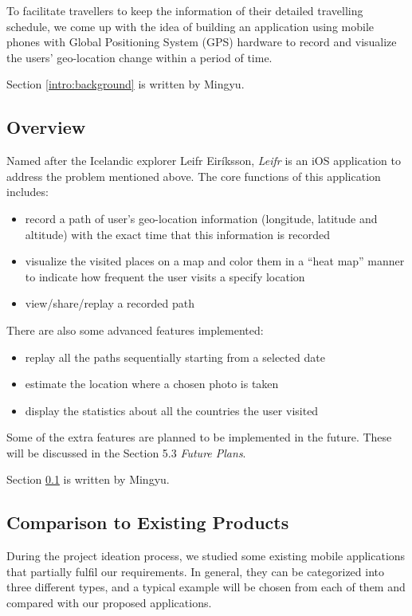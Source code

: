 \documentclass[12pt,a4paper]{article}
\begin{document}
        To facilitate travellers to keep the information of their detailed travelling schedule, we come up with the idea of building an application using mobile phones with Global Positioning System (GPS) hardware to record and visualize the users' geo-location change within a period of time.
        
        \footnotesize
            Section \ref{intro:background} is written by Mingyu.
        \normalsize
	  
	    \subsection{Overview}
	    \label{intro:overview}
        Named after the Icelandic explorer Leifr Eiríksson, \textit{Leifr} is an iOS application to address the problem mentioned above. The core functions of this application includes:
        \begin{itemize}
            \setlength\itemsep{-0.5em}
            \item record a path of user's geo-location information (longitude, latitude and altitude) with the exact time that this information is recorded
            \item visualize the visited places on a map and color them in a ``heat map'' manner to indicate how frequent the user visits a specify location
            \item view/share/replay a recorded path
        \end{itemize}
        
        There are also some advanced features implemented:
        \begin{itemize}
            \setlength\itemsep{-0.5em}
            \item replay all the paths sequentially starting from a selected date
            \item estimate the location where a chosen photo is taken
            \item display the statistics about all the countries the user visited
        \end{itemize}
        
        Some of the extra features are planned to be implemented in the future. These will be discussed in the Section 5.3 \textit{Future Plans}.
        
        \footnotesize
            Section \ref{intro:overview} is written by Mingyu.
        \normalsize
        
        \subsection{Comparison to Existing Products}
        \label{intro:comparison}
        During the project ideation process, we studied some existing mobile applications that partially fulfil our requirements. In general, they can be categorized into three different types, and a typical example will be chosen from each of them and compared with our proposed applications.
        
\end{document}
